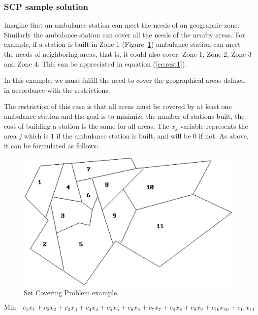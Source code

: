 \subsubsection{SCP sample solution}
Imagine that an ambulance station can meet the needs of an geographic zone. Similarly the ambulance station can cover all the needs of the nearby areas. For example, if a station is built in Zone 1 (Figure~\ref{fig:SetCovering}) ambulance station can meet the needs of neighboring areas, that is, it could also cover: Zone 1, Zone 2, Zone 3 and Zone 4.  This can be appreciated in equation (\ref{ec:rest1}).

In this example, we must fulfill the need to cover the geographical areas defined in accordance with the restrictions.

The restriction of this case is that all areas must be covered by at least one ambulance station and the goal is to minimize the number of stations built, the cost of building a station is the same for all areas. The $x_j$ variable represents the area $j$ which is $1$ if the ambulance station is built, and will be $0$ if not. As above, it can be formulated as follows:

\squeezeup
\begin{figure}[!http]
	\begin{center}
		\includegraphics[scale=0.40]{Introduccion/imagenes/SetCovering.png} %
		\caption{Set Covering Problem example.}\label{fig:SetCovering}
	\end{center}
\end{figure}
\squeezeup


\scriptsize
\begin{equation} \label{ec:SetCoveringExample} 
\mbox{Min} \quad c_{1}x_{1} + c_{2}x_{2} + c_{3}x_{3} + c_{4}x_{4} + c_{5}x_{5} + c_{6}x_{6} + c_{7}x_{7} + c_{8}x_{8} + c_{9}x_{9} + c_{10}x_{10} + c_{11}x_{11}
\end{equation}

